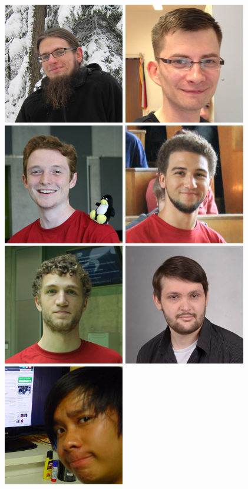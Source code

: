 \includegraphics[width=.2\linewidth]{img/fsr/200_jakob_kruse.jpg}
\includegraphics[width=.2\linewidth]{img/fsr/200_robin_trauer.jpg} %
\includegraphics[width=.2\linewidth]{img/fsr/200_kilian_koeltzsch.jpg}
\includegraphics[width=.2\linewidth]{img/fsr/200_philipp_heisig.jpg}
\includegraphics[width=.2\linewidth]{img/fsr/200_simon_hanisch.jpg} %
\includegraphics[width=.2\linewidth]{img/fsr/200_tim_hackel.jpg} %
\includegraphics[width=.2\linewidth]{img/fsr/200_duc_nguyen_tien.jpg}
